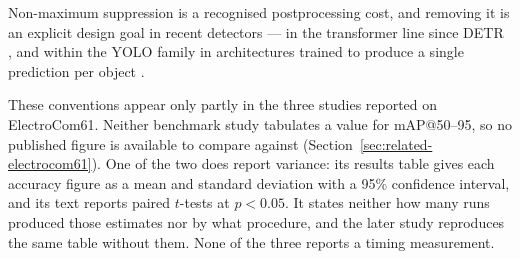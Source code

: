 Non-maximum suppression is a recognised postprocessing cost, and removing it is
an explicit design goal in recent detectors --- in the transformer line since
DETR \citep{detr}, and within the YOLO family in architectures trained to
produce a single prediction per object \citep{yolov10}.

These conventions appear only partly in the three studies reported on
ElectroCom61. Neither benchmark study tabulates a value for mAP@50--95, so no
published figure is available to compare against
(Section~\ref{sec:related-electrocom61}). One of the two does report variance:
its results table gives each accuracy figure as a mean and standard deviation with a
95\% confidence interval, and its text reports paired $t$-tests at $p < 0.05$. It
states neither how many runs produced those estimates nor by what procedure,
and the later study reproduces the same table without them. None of the three
reports a timing measurement.
